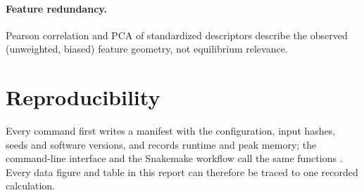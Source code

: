 \paragraph{Feature redundancy.} Pearson correlation and PCA of standardized descriptors describe the observed (unweighted, biased) feature geometry, not equilibrium relevance.

\section{Reproducibility}
Every command first writes a manifest with the configuration, input hashes, seeds and software versions, and records runtime and peak memory; the command-line interface and the Snakemake workflow call the same functions \autocite{snakemakedocs,wratten2021}. Every data figure and table in this report can therefore be traced to one recorded calculation.
